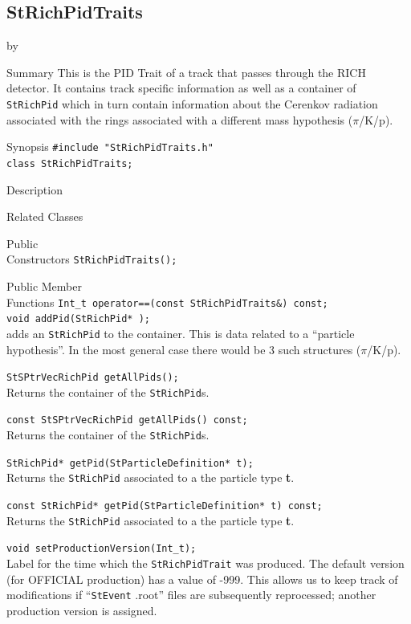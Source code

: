 \documentclass[twoside]{article}
\newcommand{\entrylabel}[1]{\mbox{\textbf{{#1}}}\hfil}%
\newenvironment{entry}
{\begin{list}{}%
    {\renewcommand{\makelabel}{\entrylabel}%
     \setlength{\labelwidth}{90pt}%
     \setlength{\leftmargin}{\labelwidth}
     \advance\leftmargin by \labelsep%
      }%
    }%
  {\end{list}}
\newcommand{\Entrylabel}[1]%
{\raisebox{0pt}[1ex][0pt]{\makebox[\labelwidth][l]%
    {\parbox[t]{\labelwidth}{\hspace{0pt}\textbf{{#1}}}}}}
\newenvironment{Entry}%
{\renewcommand{\entrylabel}{\Entrylabel}\begin{entry}}%
  {\end{entry}}
\begin{document}
\subsection{StRichPidTraits}
\label{sec:StRichPidTraits}
\begin{Entry}
\item[Summary] This is the PID Trait of a track that
    passes through the RICH detector.  It contains
    track specific information as well as a
    container of \texttt{StRichPid} which in
    turn contain information about the Cerenkov
    radiation associated with the rings associated
    with a different mass hypothesis ($\pi$/K/p).
\item[Synopsis]
    \verb+#include "StRichPidTraits.h"+\\
    \verb+class StRichPidTraits;+\\
\item[Description]
\item[Related Classes]
\item[Public\\ Constructors]
    \verb+StRichPidTraits();+\\
\item[Public Member\\ Functions]
    \verb+Int_t operator==(const StRichPidTraits&) const;+\\
    \verb+void addPid(StRichPid* );+\\
    adds an \texttt{StRichPid} to the container.
    This is data related to a ``particle hypothesis''.
    In the most general case there would be 3 such
    structures ($\pi$/K/p).
    
    \verb+StSPtrVecRichPid getAllPids();+\\
    Returns the container of the \texttt{StRichPid}s.
    
    \verb+const StSPtrVecRichPid getAllPids() const;+\\
    Returns the container of the \texttt{StRichPid}s.

    \verb+StRichPid* getPid(StParticleDefinition* t);+\\
    Returns the \texttt{StRichPid} associated to a
    the particle type {\bf t}.
    
    \verb+const StRichPid* getPid(StParticleDefinition* t) const;+\\
    Returns the \texttt{StRichPid} associated to a
    the particle type {\bf t}.

    \verb+void setProductionVersion(Int_t);+\\
    Label for the time which the \texttt{StRichPidTrait}
    was produced.  The default version (for OFFICIAL production)
    has a value of -999.  This allows us to keep track of
    modifications if ``\texttt{StEvent} .root'' files are
    subsequently reprocessed; another production version
    is assigned.
    

\end{Entry}
\end{document}
